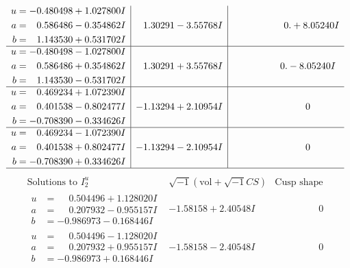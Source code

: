 \documentclass[1p]{elsarticle_modified}
\theoremstyle{definition}
\newcommand{\I}{\sqrt{-1}}
\begin{document}
$$\begin{array}{c|c|c}
\begin{aligned}
u &= -0.480498 + 1.027800 I \\
a &= \phantom{-}0.586486 - 0.354862 I \\
b &= \phantom{-}1.143530 + 0.531702 I\end{aligned}
 & \phantom{-}1.30291 - 3.55768 I & \phantom{-0.000000 -}0. + 8.05240 I \\ \hline\begin{aligned}
u &= -0.480498 - 1.027800 I \\
a &= \phantom{-}0.586486 + 0.354862 I \\
b &= \phantom{-}1.143530 - 0.531702 I\end{aligned}
 & \phantom{-}1.30291 + 3.55768 I & \phantom{-0.000000 } 0. - 8.05240 I \\ \hline\begin{aligned}
u &= \phantom{-}0.469234 + 1.072390 I \\
a &= \phantom{-}0.401538 - 0.802477 I \\
b &= -0.708390 - 0.334626 I\end{aligned}
 & -1.13294 + 2.10954 I & \phantom{-0.000000 } 0 \\ \hline\begin{aligned}
u &= \phantom{-}0.469234 - 1.072390 I \\
a &= \phantom{-}0.401538 + 0.802477 I \\
b &= -0.708390 + 0.334626 I\end{aligned}
 & -1.13294 - 2.10954 I & \phantom{-0.000000 } 0\\
 \hline 
 \end{array}$$\newpage$$\begin{array}{c|c|c}  
\text{Solutions to }I^u_{2}& \I (\text{vol} + \sqrt{-1}CS) & \text{Cusp shape}\\
 \hline 
\begin{aligned}
u &= \phantom{-}0.504496 + 1.128020 I \\
a &= \phantom{-}0.207932 - 0.955157 I \\
b &= -0.986973 - 0.168446 I\end{aligned}
 & -1.58158 + 2.40548 I & \phantom{-0.000000 } 0 \\ \hline\begin{aligned}
u &= \phantom{-}0.504496 - 1.128020 I \\
a &= \phantom{-}0.207932 + 0.955157 I \\
b &= -0.986973 + 0.168446 I\end{aligned}
 & -1.58158 - 2.40548 I & \phantom{-0.000000 } 0 \\ \hline\begin{aligned}

\end{aligned}
\end{array}$$
\end{document}
